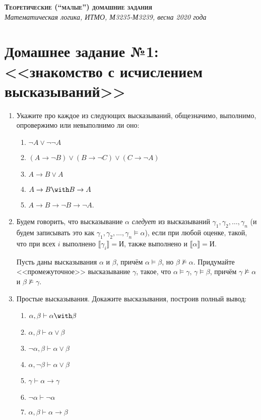 \documentclass[10pt,a4paper,oneside]{article}
\begin{document}
\begin{center}{\Large\textsc{\textbf{Теоретические (``малые'') домашние задания}}}\\
             \it Математическая логика, ИТМО, М3235-М3239, весна 2020 года\end{center}

\section*{Домашнее задание №1: <<знакомство с исчислением высказываний>>}

\begin{enumerate}

\item Укажите про каждое из следующих высказываний, общезначимо, выполнимо, опровержимо или невыполнимо ли оно:
\begin{enumerate}
\item $\neg A\vee\neg\neg A$
\item $(A\rightarrow\neg B)\vee(B\rightarrow\neg C)\vee(C\rightarrow\neg A)$
\item $A \rightarrow B \vee A$
\item $A \rightarrow B \with B \rightarrow A$
\item $A \rightarrow B \rightarrow \neg B\rightarrow\neg A$.
\end{enumerate}

\item Будем говорить, что высказывание $\alpha$ \emph{следует} из высказываний $\gamma_1, \gamma_2, \dots, \gamma_n$
(и будем записывать это как $\gamma_1, \gamma_2, \dots, \gamma_n \models \alpha$), если
при любой оценке, такой, что при всех $i$ выполнено $\llbracket\gamma_i\rrbracket = \text{И}$,
также выполнено и $\llbracket\alpha\rrbracket = \text{И}$.

Пусть даны высказывания $\alpha$ и $\beta$, причём $\alpha\models\beta$, но $\beta\not\models\alpha$. 
Придумайте <<промежуточное>> высказывание $\gamma$, такое, что $\alpha \models \gamma$,
$\gamma \models \beta$, причём $\gamma\not\models\alpha$ и $\beta\not\models\gamma$.

\item Простые высказывания. Докажите высказывания, построив полный вывод:
\begin{enumerate}
\item $\alpha,\beta \vdash \alpha\with\beta$
\item $\alpha,\beta \vdash \alpha\vee\beta$
\item $\neg\alpha,\beta \vdash \alpha\vee\beta$
\item $\alpha,\neg\beta \vdash \alpha\vee\beta$
\item $\gamma \vdash \alpha\to\gamma$
\item $\neg\alpha \vdash \neg\alpha$
\item $\alpha,\beta \vdash \alpha\rightarrow\beta$
\end{enumerate}


\end{enumerate}
\end{document}
